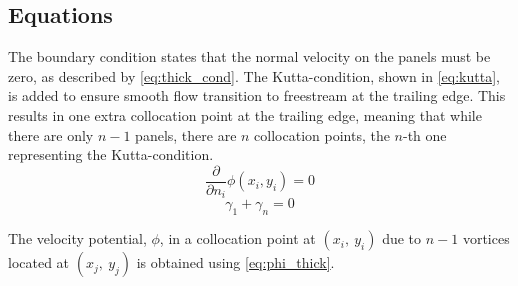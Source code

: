\subsection{Equations}
\label{ssec:eq_thick}
The boundary condition states that the normal velocity on the panels
must be zero, as described by \autoref{eq:thick_cond}\cite{kuethe_chow_1998}.
The Kutta-condition, shown in \autoref{eq:kutta}, is
added to ensure smooth flow transition to freestream at the trailing edge. This
results in one extra collocation point at the trailing edge, meaning that while
there are only $n-1$ panels, there are $n$ collocation points, the $n$-th one
representing the Kutta-condition.
\begin{equation}
  \label{eq:thick_cond}
  \frac{\partial}{\partial n_{i}} \phi\left(x_{i}, y_{i}\right)=0
  \end{equation}
\begin{equation}
  \label{eq:kutta}
      \gamma_1 + \gamma_{n} = 0
\end{equation}

The velocity potential, $\phi$, in a collocation point at $(x_i,\: y_i)$ due
to $n-1$ vortices located at $(x_j, \: y_j)$ is obtained using
\autoref{eq:phi_thick}.


